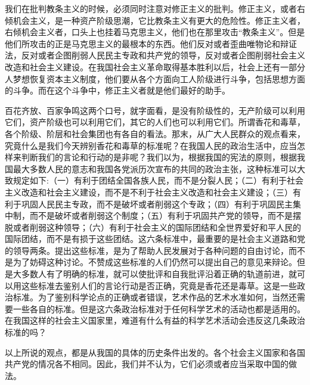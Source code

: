 我们在批判教条主义的时候，必须同时注意对修正主义的批判。修正主义，或者右倾机会主义，是一种资产阶级思潮，它比教条主义有更大的危险性。修正主义者，右倾机会主义者，口头上也挂着马克思主义，他们也在那里攻击“教条主义”。但是他们所攻击的正是马克思主义的最根本的东西。他们反对或者歪曲唯物论和辩证法，反对或者企图削弱人民民主专政和共产党的领导，反对或者企图削弱社会主义改造和社会主义建设。在我国社会主义革命取得基本胜利以后，社会上还有一部分人梦想恢复资本主义制度，他们要从各个方面向工人阶级进行斗争，包括思想方面的斗争。而在这个斗争中，修正主义者就是他们最好的助手。

百花齐放、百家争鸣这两个口号，就字面看，是没有阶级性的，无产阶级可以利用它们，资产阶级也可以利用它们，其它的人们也可以利用它们。所谓香花和毒草，各个阶级、阶层和社会集团也有各自的看法。那末，从广大人民群众的观点看来，究竟什么是我们今天辨别香花和毒草的标准呢？在我国人民的政治生活中，应当怎样来判断我们的言论和行动的是非呢？我们以为，根据我国的宪法的原则，根据我国最大多数人民的意志和我国各党派历次宣布的共同的政治主张，这种标准可以大致规定如下:（一）有利于团结全国各族人民，而不是分裂人民；（二）有利于社会主义改造和社会主义建设，而不是不利于社会主义改造和社会主义建设；（三）有利于巩固人民民主专政，而不是破坏或者削弱这个专政；（四）有利于巩固民主集中制，而不是破坏或者削弱这个制度；（五）有利于巩固共产党的领导，而不是摆脱或者削弱这种领导；（六）有利于社会主义的国际团结和全世界爱好和平人民的国际团结，而不是有损于这些团结。这六条标准中，最重要的是社会主义道路和党的领导两条。提出这些标准，是为了帮助人民发展对于各种问题的自由讨论，而不是为了妨碍这种讨论。不赞成这些标准的人们仍然可以提出自己的意见来辩论。但是大多数人有了明确的标准，就可以使批评和自我批评沿着正确的轨道前进，就可以用这些标准去鉴别人们的言论行动是否正确，究竟是香花还是毒草。这是一些政治标准。为了鉴别科学论点的正确或者错误，艺术作品的艺术水准如何，当然还需要一些各自的标准。但是这六条政治标准对于任何科学艺术的活动也都是适用的。在我国这样的社会主义国家里，难道有什么有益的科学艺术活动会违反这几条政治标准的吗？

以上所说的观点，都是从我国的具体的历史条件出发的。各个社会主义国家和各国共产党的情况各不相同。因此，我们并不认为，它们必须或者应当采取中国的做法。

